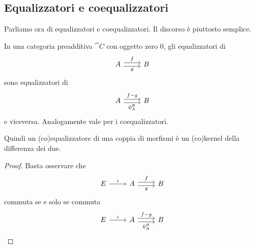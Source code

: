 \subsection{Equalizzatori e coequalizzatori}

Parliamo ora di equalizzatori e coequalizzatori. Il discorso è piuttosto
semplice.

\begin{proposition}
  In una categoria preadditiva \(\cat C\) con oggetto zero \(0\), gli
  equalizzatori di
  \[
    \begin{tikzcd}
      A \ar["f", r, shift left] \ar["g", r, shift right, swap] & B
    \end{tikzcd}
  \]
  sono equalizzatori di
  \[
    \begin{tikzcd}
      A \ar["{f-g}", r, shift left] \ar["{0_A^B}", r, shift right, swap]
      & B
    \end{tikzcd}
  \]
  e viceversa. Analogamente vale per i coequalizzatori.
\end{proposition}

Quindi un (co)equalizzatore di una coppia di morfismi è un (co)kernel
della differenza dei due.

\begin{proof}
  Basta osservare che
  \[
    \begin{tikzcd}
      E \ar["i", r] & A \ar["f", r, shift left] \ar["g", r, shift right,
      swap] & B
    \end{tikzcd}
  \]
  commuta se e solo se commuta
  \[
    \begin{tikzcd}
      E \ar["i", r] & A \ar["{f-g}", r, shift left] \ar["{0_A^B}", r,
      shift right, swap] & B
    \end{tikzcd}
    \qedhere\]
\end{proof}



